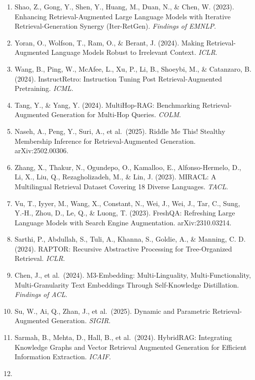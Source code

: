 \begin{enumerate}
  Xu, S., Pang, L., Shen, H., Cheng, X., \& Chua, T.-S. (2024). Search-in-the-Chain: Towards Accurate, Credible, and Traceable Large Language Models for Knowledge-Intensive Tasks. \emph{WWW}.
\item
  Shao, Z., Gong, Y., Shen, Y., Huang, M., Duan, N., \& Chen, W. (2023). Enhancing Retrieval-Augmented Large Language Models with Iterative Retrieval-Generation Synergy (Iter-RetGen). \emph{Findings of EMNLP}.
\item
  Yoran, O., Wolfson, T., Ram, O., \& Berant, J. (2024). Making Retrieval-Augmented Language Models Robust to Irrelevant Context. \emph{ICLR}.
\item
  Wang, B., Ping, W., McAfee, L., Xu, P., Li, B., Shoeybi, M., \& Catanzaro, B. (2024). InstructRetro: Instruction Tuning Post Retrieval-Augmented Pretraining. \emph{ICML}.
\item
  Tang, Y., \& Yang, Y. (2024). MultiHop-RAG: Benchmarking Retrieval-Augmented Generation for Multi-Hop Queries. \emph{COLM}.
\item
  Naseh, A., Peng, Y., Suri, A., et al.~(2025). Riddle Me This! Stealthy Membership Inference for Retrieval-Augmented Generation. arXiv:2502.00306.
\item
  Zhang, X., Thakur, N., Ogundepo, O., Kamalloo, E., Alfonso-Hermelo, D., Li, X., Liu, Q., Rezagholizadeh, M., \& Lin, J. (2023). MIRACL: A Multilingual Retrieval Dataset Covering 18 Diverse Languages. \emph{TACL}.
\item
  Vu, T., Iyyer, M., Wang, X., Constant, N., Wei, J., Wei, J., Tar, C., Sung, Y.-H., Zhou, D., Le, Q., \& Luong, T. (2023). FreshQA: Refreshing Large Language Models with Search Engine Augmentation. arXiv:2310.03214.
\item
  Sarthi, P., Abdullah, S., Tuli, A., Khanna, S., Goldie, A., \& Manning, C. D. (2024). RAPTOR: Recursive Abstractive Processing for Tree-Organized Retrieval. \emph{ICLR}.
\item
  Chen, J., et al.~(2024). M3-Embedding: Multi-Linguality, Multi-Functionality, Multi-Granularity Text Embeddings Through Self-Knowledge Distillation. \emph{Findings of ACL}.
\item
  Su, W., Ai, Q., Zhan, J., et al.~(2025). Dynamic and Parametric Retrieval-Augmented Generation. \emph{SIGIR}.
\item
  Sarmah, B., Mehta, D., Hall, B., et al.~(2024). HybridRAG: Integrating Knowledge Graphs and Vector Retrieval Augmented Generation for Efficient Information Extraction. \emph{ICAIF}.
\item

\end{enumerate}
